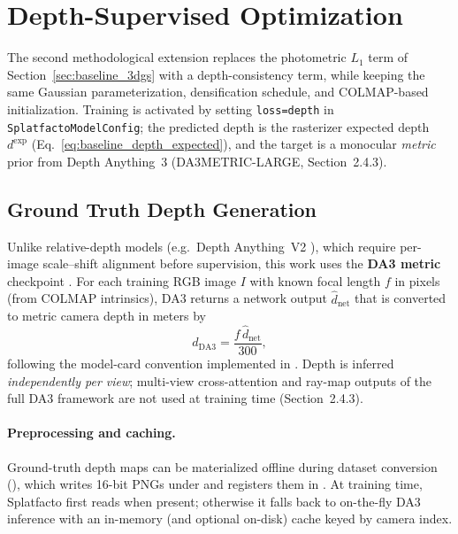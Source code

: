 \section{Depth-Supervised Optimization}
\label{sec:depth_supervised}

The second methodological extension replaces the photometric $L_1$ term of Section~\ref{sec:baseline_3dgs} with a depth-consistency term, while keeping the same Gaussian parameterization, densification schedule, and COLMAP-based initialization. Training is activated by setting \texttt{loss=depth} in \texttt{SplatfactoModelConfig}; the predicted depth is the rasterizer expected depth $d^{\mathrm{exp}}$ (Eq.~\eqref{eq:baseline_depth_expected}), and the target is a monocular \emph{metric} prior from Depth Anything~3 (DA3METRIC-LARGE, Section~2.4.3).

\subsection{Ground Truth Depth Generation}
\label{subsec:da3_gt_depth}

Unlike relative-depth models (e.g.\ Depth Anything~V2 \cite{yang2024depthanythingv2}), which require per-image scale--shift alignment before supervision, this work uses the \textbf{DA3 metric} checkpoint . For each training RGB image $I$ with known focal length $f$ in pixels (from COLMAP intrinsics), DA3 returns a network output $\hat{d}_{\mathrm{net}}$ that is converted to metric camera depth in meters by
\begin{equation}
d_{\mathrm{DA3}} = \frac{f\,\hat{d}_{\mathrm{net}}}{300},
\label{eq:da3_metric}
\end{equation}
following the model-card convention implemented in . Depth is inferred \emph{independently per view}; multi-view cross-attention and ray-map outputs of the full DA3 framework are not used at training time (Section~2.4.3).

\paragraph{Preprocessing and caching.}
Ground-truth depth maps can be materialized offline during dataset conversion (), which writes 16-bit PNGs under  and registers them in . At training time, Splatfacto first reads  when present; otherwise it falls back to on-the-fly DA3 inference with an in-memory (and optional on-disk) cache keyed by camera index.

